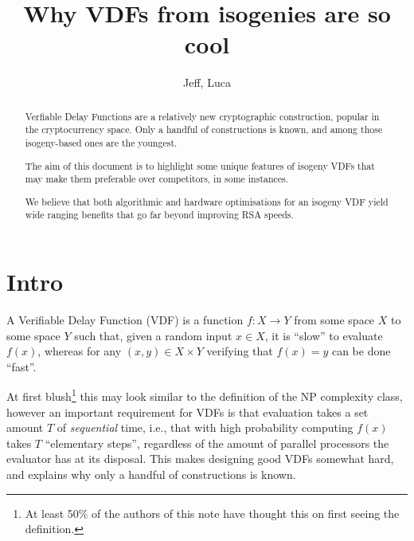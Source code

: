 \documentclass{article}
\title{Why VDFs from isogenies are so cool}
\author{Jeff, Luca}
\date{}
\begin{document}
\maketitle

\begin{abstract}
  Verfiable Delay Functions are a relatively new cryptographic
  construction, popular in the cryptocurrency space. Only a handful of
  constructions is known, and among those isogeny-based ones are the
  youngest.

  The aim of this document is to highlight some unique features of
  isogeny VDFs that may make them preferable over competitors, in some
  instances.

  We believe that both algorithmic and hardware optimisations for an
  isogeny VDF yield wide ranging benefits that go far beyond improving
  RSA speeds.
\end{abstract}

\section{Intro}

A Verifiable Delay Function (VDF) is a function $f: X → Y$ from some
space $X$ to some space $Y$ such that, given a random input $x ∈ X$,
it is ``slow'' to evaluate $f(x)$, whereas for any $(x,y) ∈ X×Y$
verifying that $f(x) = y$ can be done ``fast''.

At first blush\footnote{At least 50\% of the authors of this note have
  thought this on first seeing the definition.} this may look similar
to the definition of the NP complexity class, however an important
requirement for VDFs is that evaluation takes a set amount $T$ of
\emph{sequential} time, i.e., that with high probability computing
$f(x)$ takes $T$ ``elementary steps'', regardless of the amount of
parallel processors the evaluator has at its disposal.  This makes
designing good VDFs somewhat hard, and explains why only a handful of
constructions is known.
\end{document}
